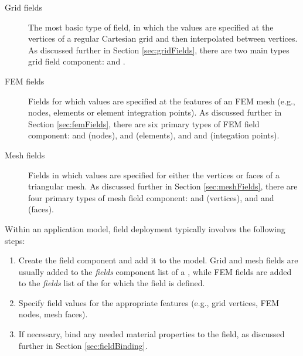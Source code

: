\begin{description}

\item[Grid fields]\mbox{}

The most basic type of field, in which the values are specified at the
vertices of a regular Cartesian grid and then interpolated between
vertices. As discussed further in Section \ref{sec:gridFields}, there
are two main types grid field component:
 and
.

\item[FEM fields]\mbox{}

Fields for which values are specified at the features of an FEM mesh
(e.g., nodes, elements or element integration points).  As discussed
further in Section \ref{sec:femFields}, there are six primary types of
FEM field component:
and
(nodes),
and
(elements), and
and
(integation points).

\item[Mesh fields]\mbox{}

Fields in which values are specified for either the vertices or faces
of a triangular mesh. As discussed
further in Section \ref{sec:meshFields}, there are four primary types of
mesh field component:
and
(vertices), and 
and
(faces).

\end{description}

Within an application model, field deployment typically involves the
following steps:

\begin{enumerate}

\item Create the field component and add it to the model. Grid and
mesh fields are usually added to the {\it fields} component list of a
, while FEM fields are
added to the {\it fields} list of the
 for which the field
is defined.

\item Specify field values for the appropriate features (e.g.,
grid vertices, FEM nodes, mesh faces).

\item If necessary, bind any needed material properties
to the field, as discussed further in Section \ref{sec:fieldBinding}.

\end{enumerate}

